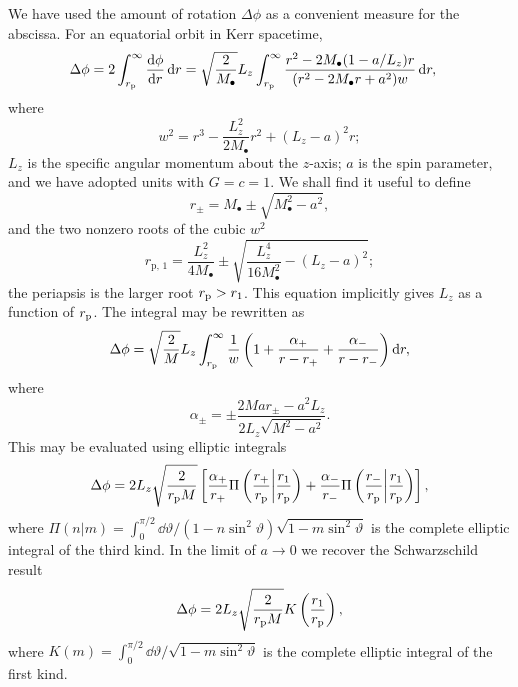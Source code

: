 We have used the amount of rotation $\Delta\phi$ as a convenient measure for the abscissa. For an equatorial orbit in Kerr spacetime,
\begin{align}
\Delta\phi  = {} & 2\int_{r_\mathrm{p}}^{\infty}{\frac{\mathrm{d} {\phi}}{\mathrm{d} {r}}}\,\mathrm{d}{r} = \sqrt{\frac{2}{M_\bullet}}L_z\int_{r_\mathrm{p}}^{\infty}{\frac{r^2 - 2M_\bullet(1 - a/L_z)r}{(r^2 - 2M_\bullet r + a^2)w}}\,\mathrm{d}{r},
\end{align}
where
\begin{equation}
w^2 = r^3 - \frac{L_z^2}{2M_\bullet}r^2 + (L_z - a)^2r;
\end{equation}
$L_z$ is the specific angular momentum about the $z$-axis; $a$ is the spin parameter, and we have adopted units with $G = c = 1$. We shall find it useful to define
\begin{equation}
r_\pm = M_\bullet \pm \sqrt{M_\bullet^2 - a^2},
\end{equation}
and the two nonzero roots of the cubic $w^2$
\begin{equation}
r_{\mathrm{p},\,1} = \frac{L_z^2}{4M_\bullet} \pm \sqrt{\frac{L_z^4}{16M_\bullet^2} - (L_z -a)^2};
\end{equation}
the periapsis is the larger root $r_\mathrm{p} > r_1$. This equation implicitly gives $L_z$ as a function of $r_\mathrm{p}$. The integral may be rewritten as
\begin{equation}
\Delta\phi = \sqrt{\frac{2}{M}}L_z\int_{r_\mathrm{p}}^{\infty}{\frac{1}{w}\left(1 + \frac{\alpha_+}{r-r_+} + \frac{\alpha_-}{r-r_-}\right)}\,\mathrm{d}{r},
\end{equation}
where
\begin{equation}
\alpha_\pm = \pm\frac{2Mar_\pm - a^2L_z}{2L_z\sqrt{M^2-a^2}}.
\end{equation}
This may be evaluated using elliptic integrals \citep[3.131.8, 3.137.8]{Gradshteyn2000}
\begin{equation}
\Delta\phi = 2 L_z \sqrt{\frac{2}{r_\mathrm{p}M}}\left[\frac{\alpha_+}{r_+}\Pi\left(\frac{r_+}{r_\mathrm{p}}\middle|\frac{r_1}{r_\mathrm{p}}\right) + \frac{\alpha_-}{r_-}\Pi\left(\frac{r_-}{r_\mathrm{p}}\middle|\frac{r_1}{r_\mathrm{p}}\right)\right],
\end{equation}
where $\Pi(n|m) = \int_{0}^{\pi/2}{\dd\vartheta/(1-n\sin^2\vartheta)\sqrt{1-m\sin^2\vartheta}}$ is the complete elliptic integral of the third kind. In the limit of $a \rightarrow 0$ we recover the Schwarzschild result \citep{Cutler1994}
\begin{equation}
\Delta\phi =  2 L_z\sqrt{\frac{2}{r_\mathrm{p}M}}K\left(\frac{r_1}{r_\mathrm{p}}\right),
\end{equation}
where $K(m) = \int_{0}^{\pi/2}{\dd\vartheta/\sqrt{1-m\sin^2\vartheta}}$ is the complete elliptic integral of the first kind.

